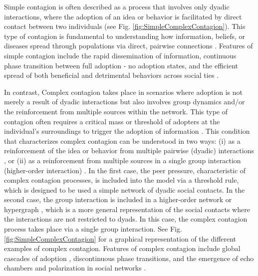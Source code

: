 Simple contagion is often described as a process that involves only dyadic interactions, where the adoption of an idea or behavior is facilitated by direct contact between two individuals (see Fig. \ref{fig:SimpleComplexContagion}). This type of contagion is fundamental to understanding how information, beliefs, or diseases spread through populations via direct, pairwise connections \cite{pastor2001epidemic, newman2002spread}. Features of simple contagion include the rapid dissemination of information, continuous phase transition between full adoption - no adoption states, and the efficient spread of both beneficial and detrimental behaviors across social ties \cite{christakis2007spread, fowler2009cooperative}.

In contrast, Complex contagion takes place in scenarios where adoption is not merely a result of dyadic interactions but also involves group dynamics and/or the reinforcement from multiple sources within the network. This type of contagion often requires a critical mass or threshold of adopters at the individual's surroundings to trigger the adoption of information \cite{centola-2007,centola-2010}. This condition that characterizes complex contagion can be understood in two ways: (i) as a reinforcement of the idea or behavior from multiple pairwise (dyadic) interactions \cite{centola-2007,centola-2010}, or (ii) as a reinforcement from multiple sources in a single group interaction (higher-order interaction) \cite{iacopini-2019,de-arruda-2020,battiston-2021}. In the first case, the peer pressure, characteristic of complex contagion processes, is included into the model via a threshold rule, which is designed to be used a simple network of dyadic social contacts. In the second case, the group interaction is included in a higher-order network or hypergraph \cite{berge1984hypergraphs}, which is a more general representation of the social contacts where the interactions are not restricted to dyads. In this case, the complex contagion process takes place via a single group interaction. See Fig. \ref{fig:SimpleComplexContagion} for a graphical representation of the different examples of complex contagion. Features of complex contagion include global cascades of adoption \cite{borge2013cascading,gleeson2017temporal}, discontinuous phase transitions, and the emergence of echo chambers and polarization in social networks \cite{centola-2007,diaz-diaz-2022}.


